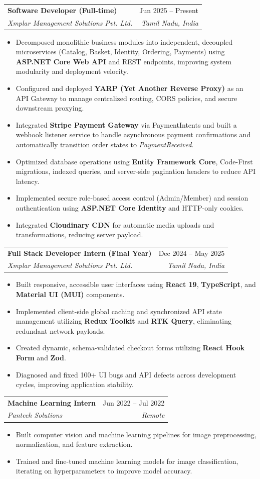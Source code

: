 \documentclass[letterpaper,11pt]{article}
\makeatletter
\newcommand{\resumeItem}[1]{
  \item\small{
    {#1 \vspace{-2pt}}
  }
}
\newcommand{\resumeSubheading}[4]{
  \vspace{-2pt}\item
    \begin{tabular*}{0.97\textwidth}[t]{l@{\extracolsep{\fill}}r}
      \textbf{#1} & #2 \\
      \textit{\small#3} & \textit{\small #4} \\
    \end{tabular*}\vspace{-7pt}
}
\newcommand{\resumeItemListStart}{\begin{itemize}}
\newcommand{\resumeItemListEnd}{\end{itemize}\vspace{-5pt}}
\makeatother
\begin{document}
    \resumeSubheading
      {Software Developer (Full-time)}{Jun 2025 -- Present}
      {Xmplar Management Solutions Pvt. Ltd.}{Tamil Nadu, India}
      \resumeItemListStart
        \resumeItem{Decomposed monolithic business modules into independent, decoupled microservices (Catalog, Basket, Identity, Ordering, Payments) using \textbf{ASP.NET Core Web API} and REST endpoints, improving system modularity and deployment velocity.}
        \resumeItem{Configured and deployed \textbf{YARP (Yet Another Reverse Proxy)} as an API Gateway to manage centralized routing, CORS policies, and secure downstream proxying.}
        \resumeItem{Integrated \textbf{Stripe Payment Gateway} via PaymentIntents and built a webhook listener service to handle asynchronous payment confirmations and automatically transition order states to \textit{PaymentReceived}.}
        \resumeItem{Optimized database operations using \textbf{Entity Framework Core}, Code-First migrations, indexed queries, and server-side pagination headers to reduce API latency.}
        \resumeItem{Implemented secure role-based access control (Admin/Member) and session authentication using \textbf{ASP.NET Core Identity} and HTTP-only cookies.}
        \resumeItem{Integrated \textbf{Cloudinary CDN} for automatic media uploads and transformations, reducing server payload.}
      \resumeItemListEnd
      
    \resumeSubheading
      {Full Stack Developer Intern (Final Year)}{Dec 2024 -- May 2025}
      {Xmplar Management Solutions Pvt. Ltd.}{Tamil Nadu, India}
      \resumeItemListStart
        \resumeItem{Built responsive, accessible user interfaces using \textbf{React 19}, \textbf{TypeScript}, and \textbf{Material UI (MUI)} components.}
        \resumeItem{Implemented client-side global caching and synchronized API state management utilizing \textbf{Redux Toolkit} and \textbf{RTK Query}, eliminating redundant network payloads.}
        \resumeItem{Created dynamic, schema-validated checkout forms utilizing \textbf{React Hook Form} and \textbf{Zod}.}
        \resumeItem{Diagnosed and fixed 100+ UI bugs and API defects across development cycles, improving application stability.}
      \resumeItemListEnd

    \resumeSubheading
      {Machine Learning Intern}{Jun 2022 -- Jul 2022}
      {Pantech Solutions}{Remote}
      \resumeItemListStart
        \resumeItem{Built computer vision and machine learning pipelines for image preprocessing, normalization, and feature extraction.}
        \resumeItem{Trained and fine-tuned machine learning models for image classification, iterating on hyperparameters to improve model accuracy.}
      \resumeItemListEnd
\end{document}
